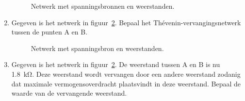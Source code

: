 \begin{enumerate}[labelindent=0pt,labelwidth=\widthof{8.88.\ },label=\textbf{\thechapter.\arabic*.},leftmargin=!,ref=\thechapter.\arabic*]
\begin{figure}[!ht]
\centering
{}
\caption{Netwerk met spanningsbronnen en weerstanden.}
\label{fig:gelthevenin3}
\end{figure}


\item
\label{que:gelthevenin2}
Gegeven is het netwerk in figuur~\ref{fig:gelnetwerkvoortheveninanalysis2}. Bepaal het Thévenin-vervangingsnetwerk tussen de punten A en B. 

\begin{figure}[!ht]
\centering
{}
\caption{Netwerk met spanningsbron en weerstanden.}
\label{fig:gelnetwerkvoortheveninanalysis2}
\end{figure}



\item
\label{que:gelthevenin2b}
Gegeven is het netwerk in figuur~\ref{fig:gelnetwerkvoortheveninanalysis2}. De weerstand tussen A en B is nu \SI{1.8}{\kilo\ohm}. Deze weerstand wordt vervangen door een andere weerstand zodanig dat maximale vermogensoverdracht plaatsvindt in deze weerstand. Bepaal de waarde van de vervangende weerstand.


\end{enumerate}
